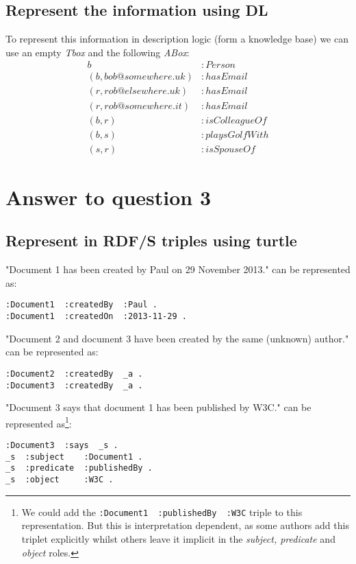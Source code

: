 \documentclass[a4paper,12pt]{article}
\begin{document}
\subsection[DL]{Represent the information using DL}
To represent this information in description logic (form a knowledge base)
we can use an empty \emph{Tbox} and the following \emph{ABox}:
\begin{align*}
                    b &: Person\\
(b, bob@somewhere.uk) &: hasEmail\\
(r, rob@elsewhere.uk) &: hasEmail\\
(r, rob@somewhere.it) &: hasEmail\\
               (b, r) &: isColleagueOf\\
               (b, s) &: playsGolfWith\\
               (s, r) &: isSpouseOf
\end{align*}

\section[Question 3]{Answer to question 3}

\subsection[Turtle]{Represent in RDF/S triples using turtle}
"Document 1 has been created by Paul on 29 November 2013." can be represented
as:
\begin{Verbatim}[samepage=true]
:Document1  :createdBy  :Paul .
:Document1  :createdOn  :2013-11-29 .
\end{Verbatim}

"Document 2 and document 3 have been created by the same (unknown) author." can
be represented as:
\begin{Verbatim}[samepage=true]
:Document2  :createdBy  _a .
:Document3  :createdBy  _a .
\end{Verbatim}

"Document 3 says that document 1 has been published by W3C." can be represented
as\footnote{We could add the \verb|:Document1  :publishedBy  :W3C| triple to
this representation.  But this is interpretation dependent, as some authors add
this triplet explicitly whilst others leave it implicit in the \emph{subject,
predicate} and \emph{object} roles.}:
\begin{Verbatim}[samepage=true]
:Document3  :says  _s .
_s  :subject    :Document1 .
_s  :predicate  :publishedBy .
_s  :object     :W3C .
\end{Verbatim}
\end{document}
